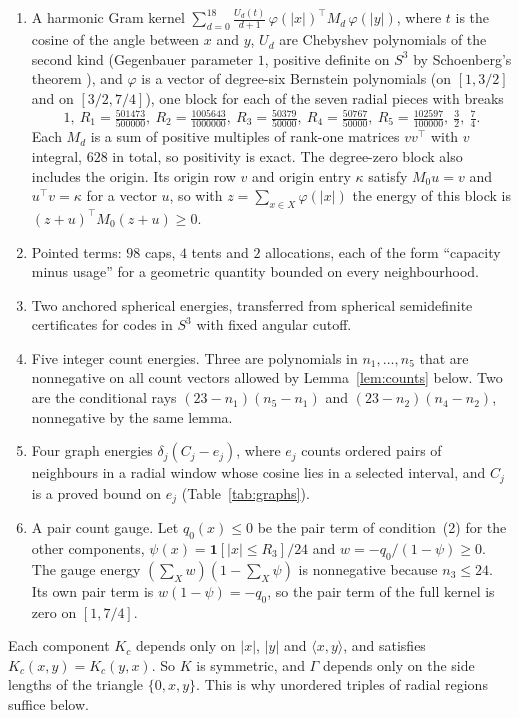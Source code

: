 \documentclass[11pt]{amsart}
\numberwithin{equation}{section}
\theoremstyle{remark}
\newcommand{\ip}[2]{\langle #1,#2\rangle}
\newcommand{\Gam}{\Gamma}
\begin{document}
\begin{enumerate}
\item A harmonic Gram kernel $\sum_{d=0}^{18}\frac{U_d(t)}{d+1}\,\varphi(|x|)^{\top}M_d\,\varphi(|y|)$, where $t$ is the cosine of the angle between $x$ and $y$, $U_d$ are Chebyshev polynomials of the second kind (Gegenbauer parameter $1$, positive definite on $S^3$ by Schoenberg's theorem \cite{Schoenberg}), and $\varphi$ is a vector of degree-six Bernstein polynomials (on $[1,3/2]$ and on $[3/2,7/4]$), one block for each of the seven radial pieces with breaks
\[
1,\ R_1=\tfrac{501473}{500000},\ R_2=\tfrac{1005643}{1000000},\ R_3=\tfrac{50379}{50000},\ R_4=\tfrac{50767}{50000},\ R_5=\tfrac{102597}{100000},\ \tfrac32,\ \tfrac74.
\]
Each $M_d$ is a sum of positive multiples of rank-one matrices $vv^\top$ with $v$ integral, $628$ in total, so positivity is exact. The degree-zero block also includes the origin. Its origin row $v$ and origin entry $\kappa$ satisfy $M_0u=v$ and $u^\top v=\kappa$ for a vector $u$, so with $z=\sum_{x\in X}\varphi(|x|)$ the energy of this block is $(z+u)^\top M_0(z+u)\ge0$.
\item Pointed terms: $98$ caps, $4$ tents and $2$ allocations, each of the form ``capacity minus usage'' for a geometric quantity bounded on every neighbourhood.
\item Two anchored spherical energies, transferred from spherical semidefinite certificates for codes in $S^3$ with fixed angular cutoff.
\item Five integer count energies. Three are polynomials in $n_1,\dots,n_5$ that are nonnegative on all count vectors allowed by Lemma~\ref{lem:counts} below. Two are the conditional rays $(23-n_1)(n_5-n_1)$ and $(23-n_2)(n_4-n_2)$, nonnegative by the same lemma.
\item Four graph energies $\delta_j(C_j-e_j)$, where $e_j$ counts ordered pairs of neighbours in a radial window whose cosine lies in a selected interval, and $C_j$ is a proved bound on $e_j$ (Table~\ref{tab:graphs}).
\item A pair count gauge. Let $q_0(x)\le0$ be the pair term of condition~(2) for the other components, $\psi(x)=\mathbf 1[|x|\le R_3]/24$ and $w=-q_0/(1-\psi)\ge0$. The gauge energy $(\sum_Xw)(1-\sum_X\psi)$ is nonnegative because $n_3\le24$. Its own pair term is $w(1-\psi)=-q_0$, so the pair term of the full kernel is zero on $[1,7/4]$.
\end{enumerate}
Each component $K_c$ depends only on $|x|$, $|y|$ and $\ip xy$, and satisfies $K_c(x,y)=K_c(y,x)$. So $K$ is symmetric, and $\Gam$ depends only on the side lengths of the triangle $\{0,x,y\}$. This is why unordered triples of radial regions suffice below.
\end{document}
